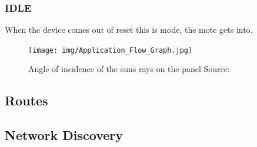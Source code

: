 \documentclass[conference]{IEEEtran}
\begin{document}
\subsubsection{IDLE} \label{IDLEMODE}
When the device comes out of reset this is mode, the mote gets into.

\begin{figure}[htbp]
    \texttt{[image: img/Application\_Flow\_Graph.jpg]}\centering
    \captionsetup{justification=centering}
    \caption{Angle of incidence of the suns rays on the panel Source: \cite{b2}}
    \label{fig:StateMachine}
\end{figure}

\subsection{Routes}

\subsection{Network Discovery} \label{NetDisc}
\end{document}
